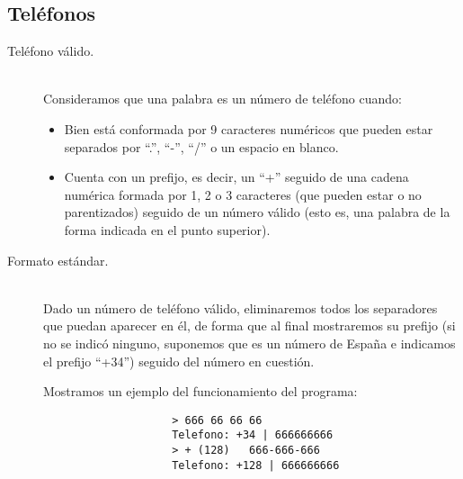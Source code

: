 \documentclass[12pt]{article}
\begin{document}
    \subsection{Teléfonos}
    \begin{description}
        \item [Teléfono válido.]~\\
            Consideramos que una palabra es un número de teléfono cuando:
            \begin{itemize}
                \item Bien está conformada por 9 caracteres numéricos que pueden estar separados por ``.'', ``-'', ``/'' o un espacio en blanco.
                \item Cuenta con un prefijo, es decir, un ``+'' seguido de una cadena numérica formada por 1, 2 o 3 caracteres (que pueden estar o no parentizados) seguido de un número válido (esto es, una palabra de la forma indicada en el punto superior).
            \end{itemize}
        \item [Formato estándar.]~\\
            Dado un número de teléfono válido, eliminaremos todos los separadores que puedan aparecer en él, de forma que al final mostraremos su prefijo (si no se indicó ninguno, suponemos que es un número de España e indicamos el prefijo ``+34'') seguido del número en cuestión.
            \begin{ejemplo}
                Mostramos un ejemplo del funcionamiento del programa:
                \begin{verbatim}
                    > 666 66 66 66
                    Telefono: +34 | 666666666
                    > + (128)   666-666-666
                    Telefono: +128 | 666666666
                \end{verbatim}
            \end{ejemplo}
    \end{description}
\end{document}
